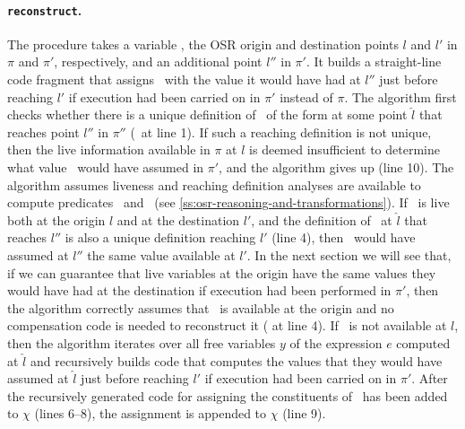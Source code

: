 \paragraph*{\texttt{reconstruct}.} The procedure  takes a variable \wx, the OSR origin and destination points $l$ and $l'$ in $\pi$ and $\pi'$, respectively, and an additional point $l''$ in $\pi'$. It builds a straight-line code fragment that assigns \wx\ with the value it would have had at $l''$ just before reaching $l'$ if execution had been carried on in $\pi'$ instead of $\pi$. The algorithm first checks whether there is a unique definition of \wx\ of the form  at some point $\hat{l}$ that reaches point $l''$ in $\pi''$ (\ureachdef\ at line 1). If such a reaching definition is not unique, then the live information available in $\pi$ at $l$ is deemed insufficient to determine what value \wx\ would have assumed in $\pi'$, and the algorithm gives up (line 10). %
The algorithm assumes liveness and reaching definition analyses are available to compute predicates \live\ and \ureachdef\ (see \mysection\ref{ss:osr-reasoning-and-transformations}). If \wx\ is live both at the origin $l$ and at the destination $l'$, and the definition of \wx\ at $\hat{l}$ that reaches $l''$ is also a unique definition reaching $l'$ (line 4), then \wx\ would have assumed at $l''$ the same value available at $l'$. In the next section we will see that, if we can guarantee that live variables at the origin have the same values they would have had at the destination if execution had been performed in $\pi'$, then the algorithm correctly assumes that \wx\ is available at the origin and no compensation code is needed to reconstruct it ( at line 4). If \wx\ is not available at $l$, then the algorithm iterates over all free variables $y$ of the expression $e$ computed at $\hat{l}$ and recursively builds code that computes the values that they would have assumed at $\hat{l}$ just before reaching $l'$ if execution had been carried on in $\pi'$. After the recursively generated code for assigning the constituents of \we\ has been added to $\chi$ (lines 6--8), the assignment  is appended to $\chi$ (line 9).
